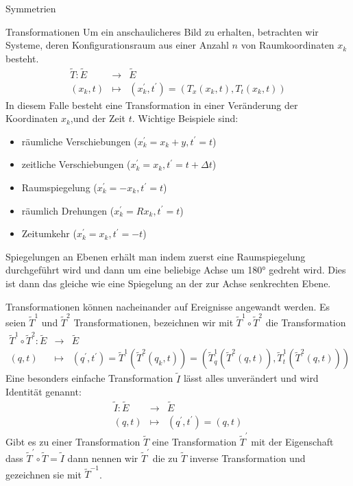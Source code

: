 \documentclass[a4paper,fleqn]{article}
\numberwithin{equation}{section}
\begin{document}
\begin{section}{Symmetrien}
\begin{subsection}{Transformationen}
Um ein anschaulicheres Bild zu erhalten, betrachten wir Systeme, deren Konfigurationsraum aus einer Anzahl $n$ von Raumkoordinaten $x_k$ besteht.
\begin{eqnarray*}
\tilde{T}: \tilde{E} &\rightarrow&\tilde{E}\\
(x_k,t) &\mapsto& ( x_k^\prime,t^\prime)=\left(T_x(x_k,t), T_t(x_k,t)\right)
\end{eqnarray*}
In diesem Falle besteht eine Transformation in einer Veränderung der Koordinaten $x_k$,und der Zeit $t$.
Wichtige Beispiele sind:
\begin{itemize}
	\item räumliche Verschiebungen ($x_k^\prime=x_k+y, t^\prime=t$)
	\item zeitliche Verschiebungen ($x_k^\prime=x_k, t^\prime=t+\Delta t$)
	\item Raumspiegelung ($x_k^\prime=-x_k, t^\prime=t$)
	\item räumlich Drehungen ($x_k^\prime=Rx_k, t^\prime=t$)
	\item Zeitumkehr ($x_k^\prime=x_k, t^\prime=-t$)
\end{itemize}
Spiegelungen an Ebenen erhält man indem zuerst eine Raumspiegelung durchgeführt wird und dann um eine beliebige Achse um 180° gedreht wird. Dies ist dann das gleiche wie eine Spiegelung an der zur Achse senkrechten Ebene.

Transformationen können nacheinander auf Ereignisse angewandt werden. Es seien $\tilde{T}^1$ und $\tilde{T}^2$ Transformationen, bezeichnen
wir mit $\tilde{T}^1\circ \tilde{T}^2$ die Transformation
\begin{eqnarray*}
\tilde{T}^1\circ \tilde{T}^2: \tilde{E} &\rightarrow&\tilde{E}\\
(q,t) &\mapsto& ( q^\prime,t^\prime)=\tilde{T}^1\left(\tilde{T}^2(q_k,t)\right)=\left(\tilde{T}^1_q\left(\tilde{T}^2(q,t)\right), \tilde{T}^1_t\left(\tilde{T}^2(q,t)\right)\right)
\end{eqnarray*}
Eine besonders einfache Transformation $\tilde{I}$ lässt alles unverändert und wird Identität genannt:
\begin{eqnarray*}
\tilde{I}: \tilde{E} &\rightarrow&\tilde{E}\\
(q,t) &\mapsto& ( q^\prime,t^\prime)=( q,t)
\end{eqnarray*}
Gibt es zu einer Transformation $\tilde{T}$ eine Transformation $\tilde{T}^\prime$ mit der Eigenschaft dass $\tilde{T}^\prime\circ\tilde{T}=\tilde{I}$ dann nennen wir $\tilde{T}^\prime$ die zu $\tilde{T}$ inverse Transformation und gezeichnen sie mit $\tilde{T}^{-1}$.


\end{subsection}
\end{section}
\end{document}
